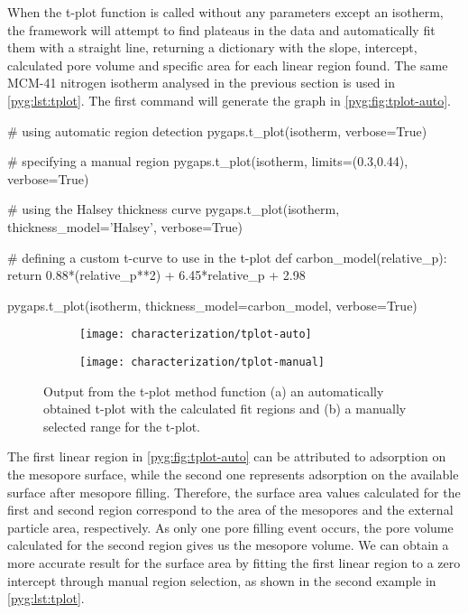 When the t-plot function is called without any parameters
except an isotherm, the framework will attempt to find 
plateaus in the data and
automatically fit them with a straight line, returning a dictionary
with the slope, intercept, calculated pore volume and specific area
for each linear region found. 
The same MCM-41 nitrogen isotherm analysed in the previous section is
used in \autoref{pyg:lst:tplot}. The first command will generate the
graph in \autoref{pyg:fig:tplot-auto}. 

\begin{python}[float=htb, caption={Generating a t-plot},%
    label={pyg:lst:tplot}]
# using automatic region detection
pygaps.t_plot(isotherm, verbose=True)

# specifying a manual region
pygaps.t_plot(isotherm, limits=(0.3,0.44), verbose=True)

# using the Halsey thickness curve
pygaps.t_plot(isotherm, thickness_model='Halsey', verbose=True)

# defining a custom t-curve to use in the t-plot
def carbon_model(relative_p):
	return 0.88*(relative_p**2) + 6.45*relative_p + 2.98

pygaps.t_plot(isotherm, thickness_model=carbon_model, verbose=True)
\end{python}

\begin{figure}[!htb]
	\centering

	\begin{subfigure}{0.45\linewidth}
		\parbox[c]{0.1\linewidth}{\caption{}%
			\label{pyg:fig:tplot-auto}}
		\parbox[b]{0.85\linewidth}{%
			\texttt{[image: characterization/tplot-auto]}}
	\end{subfigure}%
	\begin{subfigure}{0.45\linewidth}
		\parbox[c]{0.1\linewidth}{\caption{}%
			\label{pyg:fig:tplot-manual}}
		\parbox[b]{0.85\linewidth}{%
			\texttt{[image: characterization/tplot-manual]}}
	\end{subfigure}%

	\caption{Output from the t-plot method function (a) an automatically
		obtained t-plot with the calculated fit regions and (b) a manually
		selected range for the t-plot.}%
	\label{pyg:fig:tplot}

\end{figure}

The first linear region in \autoref{pyg:fig:tplot-auto} can be attributed
to adsorption on the mesopore surface,
while the second one represents adsorption on the available surface
after mesopore filling. Therefore, the surface area values calculated 
for the first and second region correspond to the area of the mesopores
and the external particle area, respectively. As only one pore filling 
event occurs, the pore volume calculated for the second region gives
us the mesopore volume. We can obtain a more accurate result for the
surface area by fitting the first linear region to a zero intercept
through manual region selection, as shown in the second example in 
\autoref{pyg:lst:tplot}.

